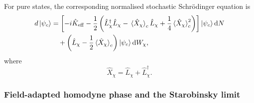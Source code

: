 \documentclass{article}
\numberwithin{equation}{section}
\begin{document}
	For pure states, the corresponding normalised stochastic Schr\"odinger equation is
	\begin{align}
		d\ket{\psi_c} &= \left[ -i\hat K_{\rm eff} -\frac12\left( \hat L_\chi^\dagger\hat L_\chi -\ev*{\hat X_\chi}_c\hat L_\chi +\frac14\ev*{\hat X_\chi}_c^2 \right) \right]\ket{\psi_c}\dd N \nonumber\\ &\quad + \left( \hat L_\chi -\frac12\ev*{\hat X_\chi}_c \right)\ket{\psi_c}\dd W_\chi ,
		\label{eq:homodyneSSEshort}
	\end{align}
	where
	\begin{equation}
		\hat X_\chi = \hat L_\chi + \hat L_\chi^\dagger .
	\end{equation}

	\subsubsection{Field-adapted homodyne phase and the Starobinsky limit}
\end{document}

